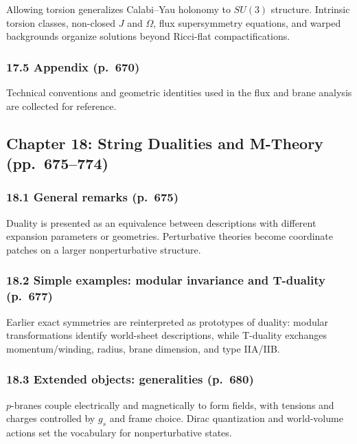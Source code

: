 \documentclass[
  10pt,
  a4paper,
  openany]{book}
\begin{document}
Allowing torsion generalizes Calabi--Yau holonomy to \(SU(3)\)
structure. Intrinsic torsion classes, non-closed \(J\) and \(\Omega\),
flux supersymmetry equations, and warped backgrounds organize solutions
beyond Ricci-flat compactifications.

\subsubsection{17.5 Appendix (p.~670)}\label{appendix-p.-670}

Technical conventions and geometric identities used in the flux and
brane analysis are collected for reference.

\subsection{Chapter 18: String Dualities and M-Theory
(pp.~675--774)}\label{chapter-18-string-dualities-and-m-theory-pp.-675774}

\subsubsection{18.1 General remarks
(p.~675)}\label{general-remarks-p.-675}

Duality is presented as an equivalence between descriptions with
different expansion parameters or geometries. Perturbative theories
become coordinate patches on a larger nonperturbative structure.

\subsubsection{18.2 Simple examples: modular invariance and T-duality
(p.~677)}\label{simple-examples-modular-invariance-and-t-duality-p.-677}

Earlier exact symmetries are reinterpreted as prototypes of duality:
modular transformations identify world-sheet descriptions, while
T-duality exchanges momentum/winding, radius, brane dimension, and type
IIA/IIB.

\subsubsection{18.3 Extended objects: generalities
(p.~680)}\label{extended-objects-generalities-p.-680}

\(p\)-branes couple electrically and magnetically to form fields, with
tensions and charges controlled by \(g_s\) and frame choice. Dirac
quantization and world-volume actions set the vocabulary for
nonperturbative states.
\end{document}
